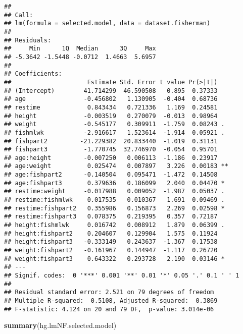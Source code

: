 \documentclass[12pt,]{article}
\newenvironment{Shaded}{\begin{snugshade}}{\end{snugshade}}
\newcommand{\KeywordTok}[1]{\textcolor[rgb]{0.13,0.29,0.53}{\textbf{#1}}}
\newcommand{\NormalTok}[1]{#1}
\begin{document}
\begin{verbatim}
## 
## Call:
## lm(formula = selected.model, data = dataset.fisherman)
## 
## Residuals:
##     Min      1Q  Median      3Q     Max 
## -5.3642 -1.5448 -0.0712  1.4663  5.6957 
## 
## Coefficients:
##                     Estimate Std. Error t value Pr(>|t|)   
## (Intercept)        41.714299  46.590508   0.895  0.37333   
## age                -0.456802   1.130905  -0.404  0.68736   
## restime             0.843434   0.721336   1.169  0.24581   
## height             -0.003519   0.270079  -0.013  0.98964   
## weight             -0.545177   0.309911  -1.759  0.08243 . 
## fishmlwk           -2.916617   1.523614  -1.914  0.05921 . 
## fishpart2         -21.229382  20.833440  -1.019  0.31131   
## fishpart3          -1.770745  32.746970  -0.054  0.95701   
## age:height         -0.007250   0.006113  -1.186  0.23917   
## age:weight          0.025474   0.007897   3.226  0.00183 **
## age:fishpart2      -0.140504   0.095471  -1.472  0.14508   
## age:fishpart3       0.379636   0.186099   2.040  0.04470 * 
## restime:weight     -0.017988   0.009052  -1.987  0.05037 . 
## restime:fishmlwk    0.017535   0.010367   1.691  0.09469 . 
## restime:fishpart2   0.355986   0.156873   2.269  0.02598 * 
## restime:fishpart3   0.078375   0.219395   0.357  0.72187   
## height:fishmlwk     0.016742   0.008912   1.879  0.06399 . 
## height:fishpart2    0.204607   0.129904   1.575  0.11924   
## height:fishpart3   -0.333149   0.243637  -1.367  0.17538   
## weight:fishpart2   -0.161967   0.144947  -1.117  0.26720   
## weight:fishpart3    0.643322   0.293728   2.190  0.03146 * 
## ---
## Signif. codes:  0 '***' 0.001 '**' 0.01 '*' 0.05 '.' 0.1 ' ' 1
## 
## Residual standard error: 2.521 on 79 degrees of freedom
## Multiple R-squared:  0.5108, Adjusted R-squared:  0.3869 
## F-statistic: 4.124 on 20 and 79 DF,  p-value: 3.014e-06
\end{verbatim}

\begin{Shaded}
\begin{Highlighting}[]
\KeywordTok{summary}\NormalTok{(hg.lmNF.selected.model)}
\end{Highlighting}
\end{Shaded}
\end{document}
